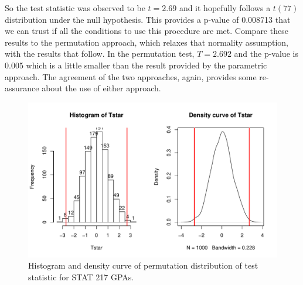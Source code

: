 \documentclass[]{book}
\newenvironment{Shaded}{\begin{snugshade}}{\end{snugshade}}
\newcommand{\KeywordTok}[1]{\textcolor[rgb]{0.13,0.29,0.53}{\textbf{#1}}}
\newcommand{\DataTypeTok}[1]{\textcolor[rgb]{0.13,0.29,0.53}{#1}}
\newcommand{\DecValTok}[1]{\textcolor[rgb]{0.00,0.00,0.81}{#1}}
\newcommand{\StringTok}[1]{\textcolor[rgb]{0.31,0.60,0.02}{#1}}
\newcommand{\OtherTok}[1]{\textcolor[rgb]{0.56,0.35,0.01}{#1}}
\newcommand{\ControlFlowTok}[1]{\textcolor[rgb]{0.13,0.29,0.53}{\textbf{#1}}}
\newcommand{\OperatorTok}[1]{\textcolor[rgb]{0.81,0.36,0.00}{\textbf{#1}}}
\newcommand{\NormalTok}[1]{#1}
\theoremstyle{definition}
\theoremstyle{definition}
\theoremstyle{remark}
\begin{document}
So the test statistic was observed to be \(t=2.69\) and it hopefully
follows a \(t(77)\) distribution under the null hypothesis. This
provides a p-value of 0.008713 that we can trust if all the conditions
to use this procedure are met. Compare these results to the permutation
approach, which relaxes that normality assumption, with the results that
follow. In the permutation test, \(T=2.692\) and the p-value is 0.005
which is a little smaller than the result provided by the parametric
approach. The agreement of the two approaches, again, provides some
re-assurance about the use of either approach.

\begin{Shaded}
\end{Shaded}




\begin{figure}
\centering
\includegraphics{02-reintroductionToStatistics_files/figure-latex/Figure2-16-1.pdf}
\caption{\label{fig:Figure2-16}Histogram and density curve of permutation distribution of
test statistic for STAT 217 GPAs.}
\end{figure}
\end{document}
